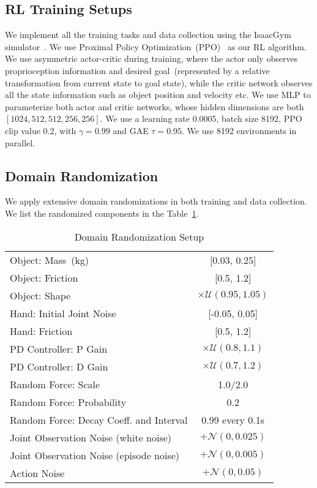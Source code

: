 \subsection{RL Training Setups}
We implement all the training tasks and data collection using the IsaacGym simulator~\cite{makoviychuk2021isaac}. We use Proximal Policy Optimization~(PPO)~\cite{schulman2017proximal} as our RL algorithm. We use asymmetric actor-critic during training, where the actor only observes proprioception information and desired goal~(represented by a relative transformation from current state to goal state), while the critic network observes all the state information such as object position and velocity etc. We use MLP to parameterize both actor and critic networks, whose hidden dimensions are both $[1024, 512, 512, 256, 256]$. We use a learning rate 0.0005, batch size 8192, PPO clip value 0.2, with $\gamma=0.99$ and GAE $\tau=0.95$. We use 8192 environments in parallel. 

\subsection{Domain Randomization}
We apply extensive domain randomizations in both training and data collection. We list the randomized components in the Table~\ref{table:dr}. 

\begin{table}[!t]
\renewcommand\arraystretch{1.05}
\caption{Domain Randomization Setup}
\centering
\begin{tabular*}{0.87\linewidth}{l@{\extracolsep{\fill}}c}
\toprule
Object: Mass~(kg)             & [0.03, 0.25]    \\
Object: Friction              & [0.5, 1.2]     \\
Object: Shape                 & $\times\mathcal{U}(0.95, 1.05)$     \\
Hand: Initial Joint Noise     & [-0.05, 0.05] \\
Hand: Friction                & [0.5, 1.2]    \\
\midrule
PD Controller: P Gain         &  $\times\mathcal{U}(0.8, 1.1)$      \\
PD Controller: D Gain         &  $\times\mathcal{U}(0.7, 1.2)$     \\
\midrule
Random Force: Scale           & 1.0/2.0       \\
Random Force: Probability     & 0.2    \\
Random Force: Decay Coeff. and Interval & 0.99 every 0.1s     \\ 
\midrule
Joint Observation Noise (white noise) &  $+\mathcal{N}(0, 0.025)$      \\
Joint Observation Noise (episode noise)      & $+\mathcal{N}(0, 0.005)$  \\
Action Noise                 & $+\mathcal{N}(0, 0.05)$   \\
\bottomrule
\end{tabular*}
\label{table:dr}
\end{table}


